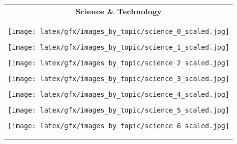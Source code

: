 \begin{table*}[ht]
\begin{tabular}{c}
                
            \textbf{Science \& Technology}  \\ \cmidrule(lr){1-1}
                    \begin{minipage}{0.08\textwidth}
                        \centering
                        \texttt{[image: latex/gfx/images\_by\_topic/science\_0\_scaled.jpg]}
                    \end{minipage}
                    \hfill
                    \begin{minipage}{0.08\textwidth}
                        \centering
                        \texttt{[image: latex/gfx/images\_by\_topic/science\_1\_scaled.jpg]}
                    \end{minipage}
                    \hfill
                    \begin{minipage}{0.08\textwidth}
                        \centering
                        \texttt{[image: latex/gfx/images\_by\_topic/science\_2\_scaled.jpg]}
                    \end{minipage}
                    \hfill
                    \begin{minipage}{0.08\textwidth}
                        \centering
                        \texttt{[image: latex/gfx/images\_by\_topic/science\_3\_scaled.jpg]}
                    \end{minipage}
                    \hfill
                    \begin{minipage}{0.08\textwidth}
                        \centering
                        \texttt{[image: latex/gfx/images\_by\_topic/science\_4\_scaled.jpg]}
                    \end{minipage}
                    \hfill
                    \begin{minipage}{0.08\textwidth}
                        \centering
                        \texttt{[image: latex/gfx/images\_by\_topic/science\_5\_scaled.jpg]}
                    \end{minipage}
                    \hfill
                    \begin{minipage}{0.08\textwidth}
                        \centering
                        \texttt{[image: latex/gfx/images\_by\_topic/science\_6\_scaled.jpg]}
                    \end{minipage}
                    \hfill

\end{tabular}
\end{table*}
